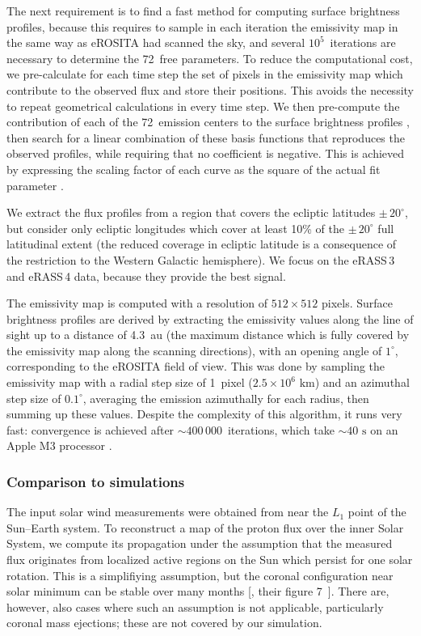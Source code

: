 \documentclass[12pt]{article}
\renewcommand{\deg}{^{\circ}}
\newcommand{\erass}{eRASS\,}
\begin{document}
The next requirement is to find a fast method for computing surface brightness profiles, because this requires to sample in each iteration the emissivity map in the same way as eROSITA had scanned the sky, and several $10^5$~iterations are necessary to determine the 72~free parameters. To reduce the computational cost, we pre-calculate for each time step the set of pixels in the emissivity map which contribute to the observed flux and store their positions. This avoids the necessity to repeat geometrical calculations in every time step. We then pre-compute the contribution of each of the 72~emission centers to the surface brightness profiles \cite{code:loc01}, then search for a linear combination of these basis functions that reproduces the observed profiles, while requiring that no coefficient is negative. This is achieved by expressing the scaling factor of each curve as the square of the actual fit parameter \cite{code:loc02}.

We extract the flux profiles from a region that covers the ecliptic latitudes $\pm\,20\deg$, but consider only ecliptic longitudes which cover at least 10\% of the $\pm\,20\deg$ full latitudinal extent (the reduced coverage in ecliptic latitude is a consequence of the restriction to the Western Galactic hemisphere). We focus on the \erass3 and \erass4 data, because they provide the best signal.

The emissivity map is computed with a resolution of $512\times512$ pixels. Surface brightness profiles are derived by extracting the emissivity values along the line of sight up to a distance of 4.3~au (the maximum distance which is fully covered by the emissivity map along the scanning directions), with an opening angle of $1\deg$, corresponding to the eROSITA field of view. This was done by sampling the emissivity map with a radial step size of 1~pixel ($2.5\times10^6\mbox{ km}$) and an azimuthal step size of $0.1\deg\!$, averaging the emission azimuthally for each radius, then summing up these values. Despite the complexity of this algorithm, it runs very fast: convergence is achieved after $\sim400\,000$~iterations, which take $\sim40\mbox{ s}$ on an Apple M3 processor \cite{code:prloc}.

\subsubsection*{Comparison to simulations}

The input solar wind measurements \cite{omniwebdata} were obtained from near the $L_1$ point of the Sun--Earth system. To reconstruct a map of the proton flux over the inner Solar System, we compute its propagation under the assumption that the measured flux originates from localized active regions on the Sun which persist for one solar rotation. This is a simplifiying assumption, but the coronal configuration near solar minimum can be stable over many months [\cite{bal09a}, their figure 7~]. There are, however, also cases where such an assumption is not applicable, particularly coronal mass ejections; these are not covered by our simulation.
\end{document}
